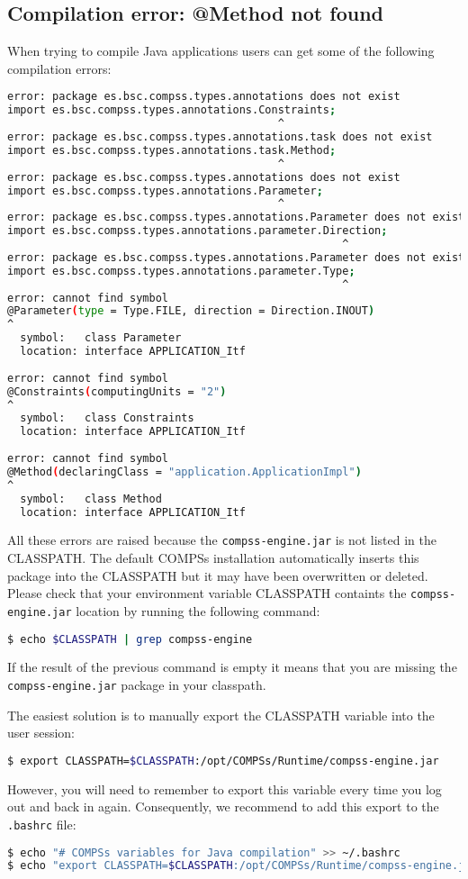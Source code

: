 \subsection{Compilation error: @Method not found}
When trying to compile Java applications users can get some of the following compilation errors:
\begin{lstlisting}[language=bash]
error: package es.bsc.compss.types.annotations does not exist
import es.bsc.compss.types.annotations.Constraints;
                                          ^
error: package es.bsc.compss.types.annotations.task does not exist
import es.bsc.compss.types.annotations.task.Method;
                                          ^
error: package es.bsc.compss.types.annotations does not exist
import es.bsc.compss.types.annotations.Parameter;
                                          ^
error: package es.bsc.compss.types.annotations.Parameter does not exist
import es.bsc.compss.types.annotations.parameter.Direction;
                                                    ^
error: package es.bsc.compss.types.annotations.Parameter does not exist
import es.bsc.compss.types.annotations.parameter.Type;
                                                    ^
error: cannot find symbol
@Parameter(type = Type.FILE, direction = Direction.INOUT)
^
  symbol:   class Parameter
  location: interface APPLICATION_Itf
  
error: cannot find symbol
@Constraints(computingUnits = "2")
^
  symbol:   class Constraints
  location: interface APPLICATION_Itf
  
error: cannot find symbol
@Method(declaringClass = "application.ApplicationImpl")
^
  symbol:   class Method
  location: interface APPLICATION_Itf
\end{lstlisting}

All these errors are raised because the \texttt{compss-engine.jar} is not listed in the CLASSPATH. The default COMPSs installation
automatically inserts this package into the CLASSPATH but it may have been overwritten or deleted. Please check that your 
environment variable CLASSPATH containts the \texttt{compss-engine.jar} location by running the following command:
\begin{lstlisting}[language=bash]
$ echo $CLASSPATH | grep compss-engine
\end{lstlisting}
If the result of the previous command is empty it means that you are missing the \texttt{compss-engine.jar} package in your classpath. 

The easiest solution is to manually export the CLASSPATH variable into the user session:
\begin{lstlisting}[language=bash]
$ export CLASSPATH=$CLASSPATH:/opt/COMPSs/Runtime/compss-engine.jar
\end{lstlisting}
However, you will need to remember to export this variable every time you log out and back in again. Consequently, we recommend to 
add this export to the \texttt{.bashrc} file:
\begin{lstlisting}[language=bash]
$ echo "# COMPSs variables for Java compilation" >> ~/.bashrc
$ echo "export CLASSPATH=$CLASSPATH:/opt/COMPSs/Runtime/compss-engine.jar" >> ~/.bashrc
\end{lstlisting}

